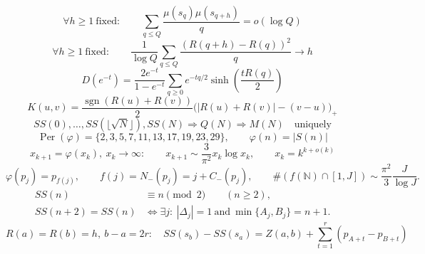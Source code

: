 \documentclass[11pt]{amsart}
\numberwithin{equation}{section}
\theoremstyle{plain}
\theoremstyle{definition}
\theoremstyle{remark}
\begin{document}
\begin{equation}
\label{eq:summary-sf-chowla}
\boxed{\;\forall h\ge1\ \text{fixed}:\qquad
\sum_{q\le Q}\frac{\mu(s_q)\mu(s_{q+h})}{q}=o(\log Q)\;}
\end{equation}
\begin{equation}
\label{eq:summary-window-variance}
\boxed{\;\forall h\ge1\ \text{fixed}:\qquad
\frac1{\log Q}\sum_{q\le Q}
\frac{(R(q+h)-R(q))^2}{q}\to h\;}
\end{equation}
\begin{equation}
\label{eq:summary-D-sinh}
\boxed{\;D(e^{-t})=
\frac{2e^{-t}}{1-e^{-t}}\sum_{q\ge0}e^{-tq/2}
\sinh\!\left(\frac{tR(q)}2\right)\;}
\end{equation}
\begin{equation}
\label{eq:summary-survival-kernel}
\boxed{\;K(u,v)=\frac{\operatorname{sgn}(R(u)+R(v))}{2}
\bigl(|R(u)+R(v)|-(v-u)\bigr)_+\;}
\end{equation}
\begin{equation}
\label{eq:summary-sqrt-recovery}
\boxed{\;SS(0),\ldots,SS(\lfloor\sqrt N\rfloor),SS(N)
\Longrightarrow Q(N)\Longrightarrow M(N)\quad\text{uniquely}\;}
\end{equation}
\begin{equation}
\label{eq:summary-phi-dynamics}
\boxed{\;\operatorname{Per}(\varphi)=\{2,3,5,7,11,13,17,19,23,29\},
\qquad \varphi(n)=|S(n)|\;}
\end{equation}
\begin{equation}
\label{eq:summary-phi-escape}
\boxed{\;x_{k+1}=\varphi(x_k),\ x_k\to\infty:
\qquad x_{k+1}\sim\frac{3}{\pi^2}x_k\log x_k,
\qquad x_k=k^{k+o(k)}\;}
\end{equation}
\begin{equation}
\label{eq:summary-prime-index-dynamics}
\boxed{\;\varphi(p_j)=p_{f(j)},\qquad
f(j)=N_-(p_j)=j+C_-(p_j),\qquad
\#(f(\mathbb N)\cap[1,J])\sim\frac{\pi^2}{3}\frac{J}{\log J}.\;}
\end{equation}
\begin{equation}
\label{eq:summary-parity-collision}
\boxed{\begin{aligned}
SS(n)&\equiv n\pmod2\qquad(n\ge2),\\
SS(n+2)=SS(n)&\iff \exists j:\ |\Delta_j|=1
\ \text{and}\ \min\{A_j,B_j\}=n+1.
\end{aligned}}
\end{equation}
\begin{equation}
\label{eq:summary-level-return}
\boxed{\;R(a)=R(b)=h,\ b-a=2r:\quad
SS(s_b)-SS(s_a)=Z(a,b)+\sum_{t=1}^{r}(p_{A+t}-p_{B+t})\;}
\end{equation}
\end{document}

